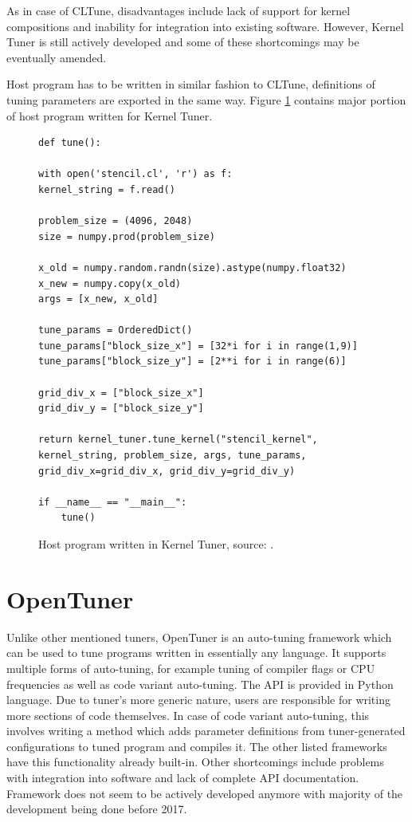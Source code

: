 \documentclass
[
    digital, %
    oneside, %
    table, %
    nolof, %
    nolot, %
    nocover %
]{fithesis3}
\begin{document}
As in case of CLTune, disadvantages include lack of support for kernel compositions and inability for integration into existing software. However,
Kernel Tuner is still actively developed and some of these shortcomings may be eventually amended.

Host program has to be written in similar fashion to CLTune, definitions of tuning parameters are exported in the same way. Figure \ref{kerneltuner-example}
contains major portion of host program written for Kernel Tuner.
\begin{figure}[ht]
\begin{adjustwidth}{-1cm}{-1cm}
\begin{lstlisting}
def tune():

with open('stencil.cl', 'r') as f:
kernel_string = f.read()

problem_size = (4096, 2048)
size = numpy.prod(problem_size)

x_old = numpy.random.randn(size).astype(numpy.float32)
x_new = numpy.copy(x_old)
args = [x_new, x_old]

tune_params = OrderedDict()
tune_params["block_size_x"] = [32*i for i in range(1,9)]
tune_params["block_size_y"] = [2**i for i in range(6)]

grid_div_x = ["block_size_x"]
grid_div_y = ["block_size_y"]

return kernel_tuner.tune_kernel("stencil_kernel", kernel_string, problem_size, args, tune_params, grid_div_x=grid_div_x, grid_div_y=grid_div_y)

if __name__ == "__main__":
    tune()
\end{lstlisting}
\caption{Host program written in Kernel Tuner, source: \cite{kerneltuner-example}.}
\label{kerneltuner-example}
\end{adjustwidth}
\end{figure}

\section{OpenTuner}
Unlike other mentioned tuners, OpenTuner \cite{opentuner} is an auto-tuning framework which can be used to tune programs written in essentially any
language. It supports multiple forms of auto-tuning, for example tuning of compiler flags or CPU frequencies as well as code variant auto-tuning. The
API is provided in Python language. Due to tuner's more generic nature, users are responsible for writing more sections of code themselves. In case of code
variant auto-tuning, this involves writing a method which adds parameter definitions from tuner-generated configurations to tuned program and compiles
it. The other listed frameworks have this functionality already built-in. Other shortcomings include problems with integration into software and lack of
complete API documentation. Framework does not seem to be actively developed anymore with majority of the development being done before 2017.
\end{document}
